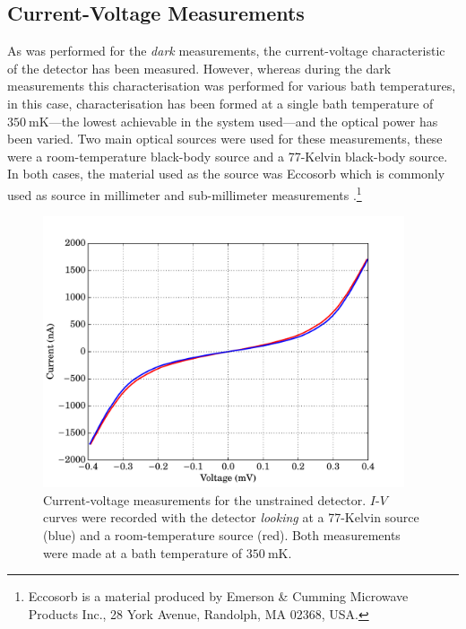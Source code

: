 \subsection{Current-Voltage Measurements}\label{ssec:opticalControlSi_IV}
As was performed for the \textit{dark} measurements, the current-voltage characteristic of the detector has been measured. However, whereas during the dark measurements this characterisation was performed for various bath temperatures, in this case, characterisation has been formed at a single bath temperature of $350~\mathrm{mK}$---the lowest achievable in the system used---and the optical power has been varied. Two main optical sources were used for these measurements, these were a room-temperature black-body source and a 77-Kelvin black-body source. In both cases, the material used as the source was Eccosorb which is commonly used as source in millimeter and sub-millimeter measurements \parencite[see, for example,][]{Mather1999}.\footnote{Eccosorb is a material produced by Emerson \& Cumming Microwave Products Inc., 28 York Avenue, Randolph, MA 02368, USA.} 
\begin{figure}[tb]
\begin{center}
\includegraphics[width = 0.95\textwidth]{figures/control_IVs_77_300}
\caption[Current-voltage measurements for an optically-loaded unstrained SiCEB]{Current-voltage measurements for the unstrained detector. {$I$-$V$} curves were recorded with the detector \textit{looking} at a 77-Kelvin source (blue) and a room-temperature source (red). Both measurements were made at a bath temperature of $350~\mathrm{mK}$.}
\label{fig:controlIVs_optical}
\end{center}
\end{figure}
